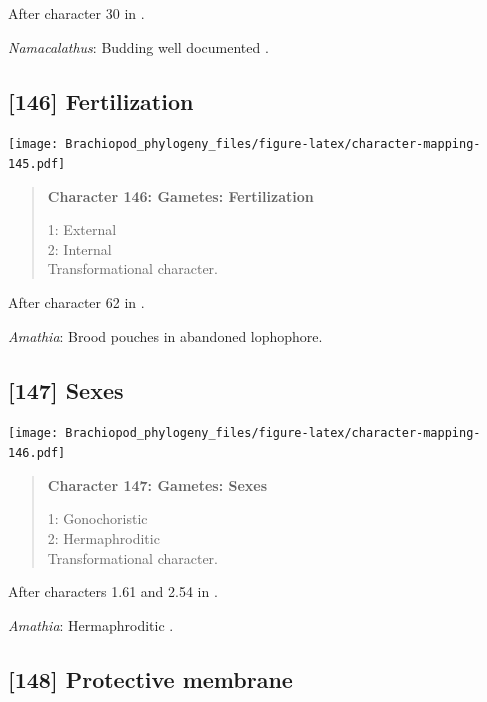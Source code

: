\documentclass[openany]{book}
\begin{document}
After character 30 in \citet{Haszprunar1996}.

\hypertarget{Namacalathus-coding-145}{}
\emph{Namacalathus}: Budding well documented
\citep[e.g.][]{Zhuravlev2015Ediacaranskeletal}.

\subsection*{{[}146{]} Fertilization}\label{fertilization}

\texttt{[image: Brachiopod\_phylogeny\_files/figure-latex/character-mapping-145.pdf]}

\begin{quote}
\textbf{Character 146: Gametes: Fertilization}

1: External\\
2: Internal\\
Transformational character.
\end{quote}

After character 62 in \citet{Haszprunar2000}.

\hypertarget{Amathia-coding-146}{}
\emph{Amathia}: Brood pouches in abandoned lophophore.

\subsection*{{[}147{]} Sexes}\label{sexes}

\texttt{[image: Brachiopod\_phylogeny\_files/figure-latex/character-mapping-146.pdf]}

\begin{quote}
\textbf{Character 147: Gametes: Sexes}

1: Gonochoristic\\
2: Hermaphroditic\\
Transformational character.
\end{quote}

After characters 1.61 and 2.54 in \citet{SPS1996}.

\hypertarget{Amathia-coding-147}{}
\emph{Amathia}: Hermaphroditic \citep{Reed1988}.

\subsection*{{[}148{]} Protective membrane}\label{protective-membrane}
\end{document}
